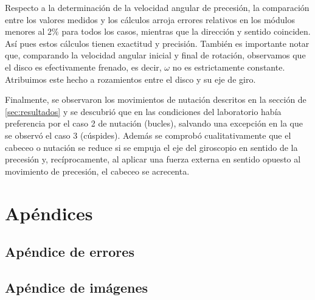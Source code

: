 \documentclass[a4paper]{article}
\begin{document}
Respecto a la determinación de la velocidad angular de precesión, la comparación entre los valores medidos y los cálculos arroja errores relativos en los módulos menores al 2\% para todos los casos, mientras que la dirección y sentido coinciden. Así pues estos cálculos tienen exactitud y precisión. También es importante notar que, comparando la velocidad angular inicial y final de rotación, observamos que el disco es efectivamente frenado, es decir, $\omega$ no es estrictamente constante. Atribuimos este hecho a rozamientos entre el disco y su eje de giro.

Finalmente, se observaron los movimientos de nutación descritos en la sección de \ref{sec:resultados} y se descubrió que en las condiciones del laboratorio había preferencia por el caso 2 de nutación (bucles), salvando una excepción en la que se observó el caso 3 (cúspides). Además se comprobó cualitativamente que el cabeceo o nutación se reduce si se empuja el eje del giroscopio en sentido de la precesión y, recíprocamente, al aplicar una fuerza externa en sentido opuesto al movimiento de precesión, el cabeceo se acrecenta.
\section*{Apéndices}
\subsection*{Apéndice de errores}
\subsection*{Apéndice de imágenes}
\nocite{*}


\end{document}
